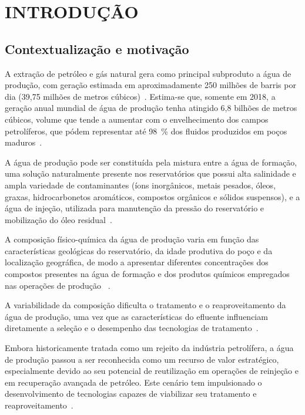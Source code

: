\chapter{INTRODUÇÃO}


\section{Contextualização e motivação}

A extração de petróleo e gás natural gera como principal subproduto a água de produção, com geração estimada em aproximadamente 250 milhões de barris por dia (39,75 milhões de metros cúbicos)~\cite{w15162980, MembranePW_JSDEWES_2024}. Estima-se que, somente em 2018, a geração anual mundial de água de produção tenha atingido 6,8 bilhões de metros cúbicos, volume que tende a aumentar com o envelhecimento dos campos petrolíferos, que pódem representar até 98~\% dos fluidos produzidos em poços maduros~\cite{w15234088,ALGHOUTI2019222}. 

A água de produção pode ser constituída pela mistura entre a água de formação, uma solução naturalmente presente nos reservatórios que possui alta salinidade e ampla variedade de contaminantes (íons inorgânicos, metais pesados, óleos, graxas, hidrocarbonetos aromáticos, compostos orgânicos e sólidos suspensos), e a água de injeção, utilizada para manutenção da pressão do reservatório e mobilização do óleo residual~\cite{BEYER2020105155, ALGHOUTI2019222, w13020183, Mansi2022ProducedWater}.

A composição físico-química da água de produção varia em função das características geológicas do reservatório, da idade produtiva do poço e da localização geográfica, de modo a apresentar diferentes concentrações dos compostos presentes na água de formação e dos produtos químicos empregados nas operações de produção ~\cite{BEYER2020105155, ALGHOUTI2019222, w13020183, Mansi2022ProducedWater}.

A variabilidade da composição dificulta o tratamento e o reaproveitamento da água de produção, uma vez que as características do efluente influenciam diretamente a seleção e o desempenho das tecnologias de tratamento~\cite{ALGHOUTI2019222, Ahmadun2009PWTechnologies}.

Embora historicamente tratada como um rejeito da indústria petrolífera, a água de produção passou a ser reconhecida como um recurso de valor estratégico, especialmente devido ao seu potencial de reutilização em operações de reinjeção e em recuperação avançada de petróleo. Este cenário tem impulsionado o desenvolvimento de tecnologias capazes de viabilizar seu tratamento e reaproveitamento~\cite{Liang2018ProducedWater, Rajbongshi2024ProducedWaterReview, Nawaz2021FO_MD}. 


